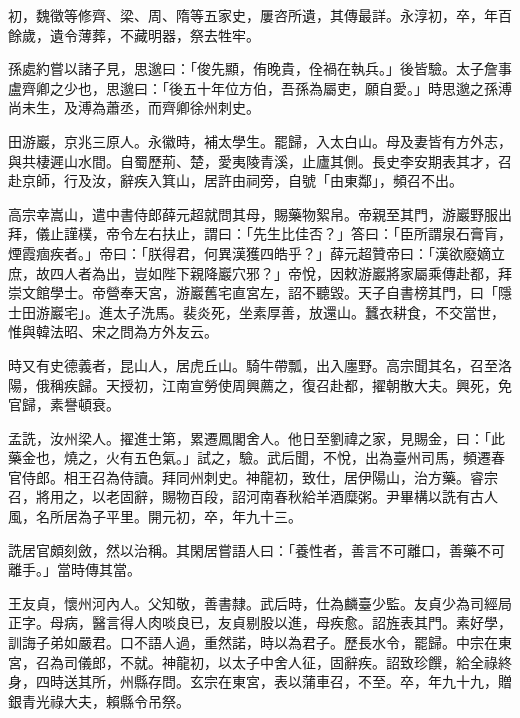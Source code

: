 \begin{pinyinscope}
 初，魏徵等修齊、梁、周、隋等五家史，屢咨所遺，其傳最詳。永淳初，卒，年百餘歲，遺令薄葬，不藏明器，祭去牲牢。



 孫處約嘗以諸子見，思邈曰：「俊先顯，侑晚貴，佺禍在執兵。」後皆驗。太子詹事盧齊卿之少也，思邈曰：「後五十年位方伯，吾孫為屬吏，願自愛。」時思邈之孫溥尚未生，及溥為蕭丞，而齊卿徐州刺史。



 田游巖，京兆三原人。永徽時，補太學生。罷歸，入太白山。母及妻皆有方外志，與共棲遲山水間。自蜀歷荊、楚，愛夷陵青溪，止廬其側。長史李安期表其才，召赴京師，行及汝，辭疾入箕山，居許由祠旁，自號「由東鄰」，頻召不出。



 高宗幸嵩山，遣中書侍郎薛元超就問其母，賜藥物絮帛。帝親至其門，游巖野服出拜，儀止謹樸，帝令左右扶止，謂曰：「先生比佳否？」答曰：「臣所謂泉石膏肓，煙霞痼疾者。」帝曰：「朕得君，何異漢獲四皓乎？」薛元超贊帝曰：「漢欲廢嫡立庶，故四人者為出，豈如陛下親降巖穴邪？」帝悅，因敕游巖將家屬乘傳赴都，拜崇文館學士。帝營奉天宮，游巖舊宅直宮左，詔不聽毀。天子自書榜其門，曰「隱士田游巖宅」。進太子洗馬。裴炎死，坐素厚善，放還山。蠶衣耕食，不交當世，惟與韓法昭、宋之問為方外友云。



 時又有史德義者，昆山人，居虎丘山。騎牛帶瓢，出入廛野。高宗聞其名，召至洛陽，俄稱疾歸。天授初，江南宣勞使周興薦之，復召赴都，擢朝散大夫。興死，免官歸，素譽頓衰。



 孟詵，汝州梁人。擢進士第，累遷鳳閣舍人。他日至劉禕之家，見賜金，曰：「此藥金也，燒之，火有五色氣。」試之，驗。武后聞，不悅，出為臺州司馬，頻遷春官侍郎。相王召為侍讀。拜同州刺史。神龍初，致仕，居伊陽山，治方藥。睿宗召，將用之，以老固辭，賜物百段，詔河南春秋給羊酒糜粥。尹畢構以詵有古人風，名所居為子平里。開元初，卒，年九十三。



 詵居官頗刻斂，然以治稱。其閑居嘗語人曰：「養性者，善言不可離口，善藥不可離手。」當時傳其當。



 王友貞，懷州河內人。父知敬，善書隸。武后時，仕為麟臺少監。友貞少為司經局正字。母病，醫言得人肉啖良已，友貞剔股以進，母疾愈。詔旌表其門。素好學，訓誨子弟如嚴君。口不語人過，重然諾，時以為君子。歷長水令，罷歸。中宗在東宮，召為司儀郎，不就。神龍初，以太子中舍人征，固辭疾。詔致珍饌，給全祿終身，四時送其所，州縣存問。玄宗在東宮，表以蒲車召，不至。卒，年九十九，贈銀青光祿大夫，賴縣令吊祭。




\end{pinyinscope}
